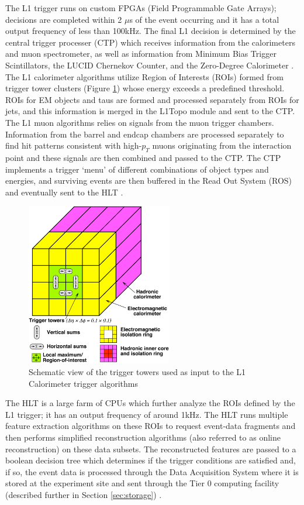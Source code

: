 The L1 trigger runs on custom FPGAs (Field Programmable Gate Arrays); decisions are completed within 2 $\mu$s of the event occurring and it has a total output frequency of less than 100kHz. The final L1 decision is determined by the central trigger processer (CTP) which receives information from the calorimeters and muon spectrometer, as well as information from Minimum Bias Trigger Scintillators, the LUCID Chernekov Counter, and the Zero-Degree Calorimeter \cite{atlas}. The L1 calorimeter algorithms utilize Region of Interests (ROIs) formed from trigger tower clusters (Figure \ref{fig:l1calo}) whose energy exceeds a predefined threshold. ROIs for EM objects and taus are formed and processed separately from ROIs for jets, and this information is merged in the L1Topo module and sent to the CTP. The L1 muon algorithms relies on signals from the muon trigger chambers. Information from the barrel and endcap chambers are processed separately to find hit patterns consistent with high-$p_T$ muons originating from the interaction point and these signals are then combined and passed to the CTP. The CTP implements a trigger `menu' of different combinations of object types and energies, and surviving events are then buffered in the Read Out System (ROS) and eventually sent to the HLT \cite{trig_2015}.\\

\begin{figure}[hb!]
    \centering
    \includegraphics[width=2.5in]{figures/chapter3/l1calo.png}
    \caption{Schematic view of the trigger towers used as input to the L1 Calorimeter trigger algorithms}
    \label{fig:l1calo}
\end{figure}

The HLT is a large farm of CPUs which further analyze the ROIs defined by the L1 trigger; it has an output frequency of around 1kHz. The HLT runs multiple feature extraction algorithms on these ROIs to request event-data fragments and then performs simplified reconstruction algorithms (also referred to as online reconstruction) on these data subsets. The reconstructed features are passed to a boolean decision tree which determines if the trigger conditions are satisfied and, if so, the event data is processed through the Data Acquisition System where it is stored at the experiment site and sent through the Tier 0 computing facility (described further in Section \ref{sec:storage}) \cite{trig_2017}.\\

